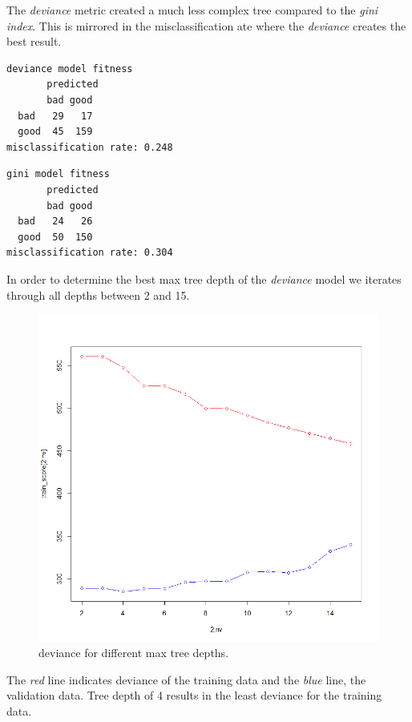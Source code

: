 \documentclass[a4paper,12pt]{article}
\begin{document}
The \textit{deviance} metric created a much less complex tree compared to the \textit{gini index}. This is mirrored in the misclassification ate where the \textit{deviance} creates the best result.

\begin{minipage}[]{0.49\textwidth}
 \begin{verbatim}
deviance model fitness
       predicted
       bad good
  bad   29   17
  good  45  159
misclassification rate: 0.248
\end{verbatim}
 \end{minipage}
 \begin{minipage}[]{0.49\textwidth}
\begin{verbatim}
gini model fitness
       predicted
       bad good
  bad   24   26
  good  50  150
misclassification rate: 0.304
\end{verbatim}
 \end{minipage}

In order to determine the best max tree depth of the \textit{deviance} model we iterates through all depths between 2 and 15.
\begin{figure}[H]
\centering
\begin{minipage}[]{0.5\textwidth}
  \includegraphics[width=\textwidth]{figures/tree_depth.png}  
  \caption{deviance for different max tree depths.\label{fig:logit_plot}}
 \end{minipage}
\end{figure}
The \textit{red} line indicates deviance of the training data and the \textit{blue} line, the validation data. Tree depth of 4 results in the least deviance for the training data.
\end{document}
